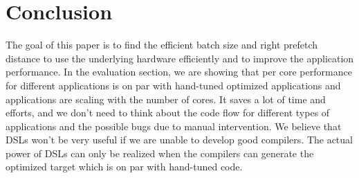 \section{Conclusion}
\label{section6} 
The goal of this paper is to find the efficient batch size and right prefetch distance to use the underlying hardware efficiently and to improve the application performance. In the evaluation section, we are showing that per core performance for different applications is on par with hand-tuned optimized applications and applications are scaling with the number of cores. It saves a lot of time and efforts, and we don't need to think about the code flow for different types of applications and the possible bugs due to manual intervention. We believe that DSLs won't be very useful if we are unable to develop good compilers. The actual power of DSLs can only be realized when the compilers can generate the optimized target which is on par with hand-tuned code.
